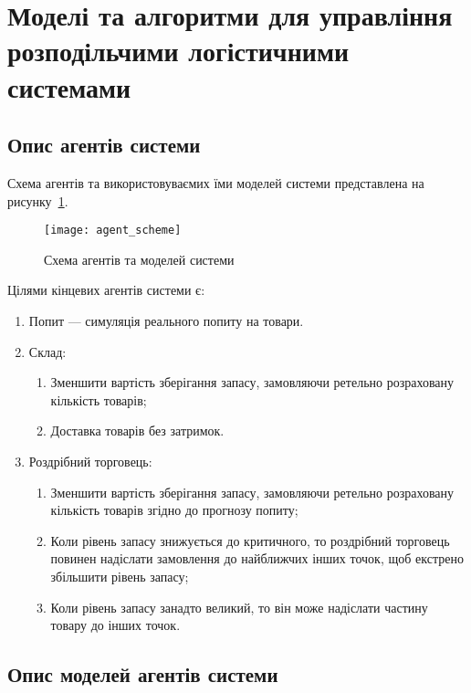 \section{Моделі та алгоритми для управління розподільчими логістичними системами}
\subsection{Опис агентів системи}
Схема агентів та використовуваємих їми моделей системи представлена на рисунку~\ref{fig:agent_scheme}.

\begin{figure}[H]
	\centering
	\texttt{[image: agent\_scheme]}
	\caption{Схема агентів та моделей системи}
	\label{fig:agent_scheme}
\end{figure} 

Цілями кінцевих агентів системи є:

\begin{enumerate}
	\item Попит --- симуляція реального попиту на товари.
	\item Склад:
	\begin{enumerate}[label={2.\arabic*}]
		\item Зменшити вартість зберігання запасу, замовляючи ретельно розраховану кількість товарів;
		\item Доставка товарів без затримок.
	\end{enumerate}
	\item Роздрібний торговець:
	\begin{enumerate}[label={3.\arabic*}]
		\item Зменшити вартість зберігання запасу, замовляючи ретельно розраховану кількість товарів згідно до прогнозу попиту;
		\item Коли рівень запасу знижується до критичного, то роздрібний торговець повинен надіслати замовлення до найближчих інших точок, щоб екстрено збільшити рівень запасу;
		\item Коли рівень запасу занадто великий, то він може надіслати частину товару до інших точок.
	\end{enumerate}
\end{enumerate}

\subsection{Опис моделей агентів системи}
